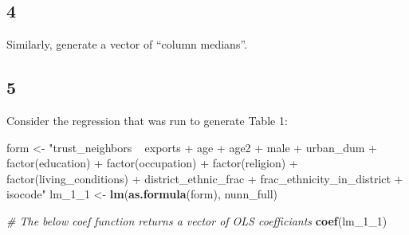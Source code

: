 \documentclass[]{book}
\newenvironment{Shaded}{\begin{snugshade}}{\end{snugshade}}
\newcommand{\CommentTok}[1]{\textcolor[rgb]{0.56,0.35,0.01}{\textit{#1}}}
\newcommand{\DecValTok}[1]{\textcolor[rgb]{0.00,0.00,0.81}{#1}}
\newcommand{\KeywordTok}[1]{\textcolor[rgb]{0.13,0.29,0.53}{\textbf{#1}}}
\newcommand{\NormalTok}[1]{#1}
\newcommand{\StringTok}[1]{\textcolor[rgb]{0.31,0.60,0.02}{#1}}
\theoremstyle{definition}
\theoremstyle{definition}
\theoremstyle{definition}
\theoremstyle{remark}
\begin{document}
\hypertarget{section-12}{%
\subsection*{4}\label{section-12}}

Similarly, generate a vector of ``column medians''.

\hypertarget{section-13}{%
\subsection*{5}\label{section-13}}

Consider the regression that was run to generate Table 1:

\begin{Shaded}
\begin{Highlighting}[]
\NormalTok{form <-}\StringTok{ "trust_neighbors ~ exports + age + age2 +  male + urban_dum + factor(education) + factor(occupation) + factor(religion) + factor(living_conditions) + district_ethnic_frac + frac_ethnicity_in_district + isocode"}
\NormalTok{lm_}\DecValTok{1}\NormalTok{_}\DecValTok{1}\NormalTok{ <-}\StringTok{ }\KeywordTok{lm}\NormalTok{(}\KeywordTok{as.formula}\NormalTok{(form), nunn_full)}

\CommentTok{# The below coef function returns a vector of OLS coefficiants}
\KeywordTok{coef}\NormalTok{(lm_}\DecValTok{1}\NormalTok{_}\DecValTok{1}\NormalTok{)}
\end{Highlighting}
\end{Shaded}
\end{document}

